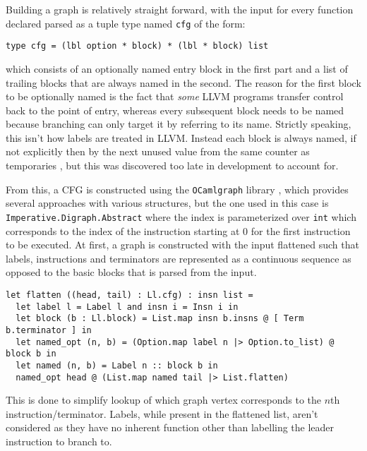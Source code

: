 \documentclass{article}
\begin{document}


Building a graph is relatively straight forward, with the input for every function declared parsed as a tuple type named \texttt{cfg}  of the form:
\begin{verbatim}
type cfg = (lbl option * block) * (lbl * block) list
\end{verbatim}
which consists of an optionally named entry block in the first part and a list of trailing blocks that are always named in the second. The reason for the first block to be optionally named is the fact that \textit{some} LLVM programs transfer control back to the point of entry, whereas every subsequent block needs to be named because branching can only target it by referring to its name. Strictly speaking, this isn't how labels are treated in LLVM. Instead each block is always named, if not explicitly then by the next unused value from the same counter as temporaries \cite{llvm-functions}, but this was discovered too late in development to account for.

From this, a CFG is constructed  using the \texttt{OCamlgraph} library \cite{ocamlgraph}, which provides several approaches with  various  structures, but the one used in this case is \texttt{Imperative.Digraph.Abstract} where the index is parameterized over \texttt{int} which corresponds to the index of the instruction starting at 0 for the first instruction to be executed. At first, a graph is constructed with the input flattened such that labels, instructions and terminators are represented as a continuous sequence as opposed to the basic blocks that is parsed from the input.

\begin{verbatim}
let flatten ((head, tail) : Ll.cfg) : insn list =
  let label l = Label l and insn i = Insn i in
  let block (b : Ll.block) = List.map insn b.insns @ [ Term b.terminator ] in
  let named_opt (n, b) = (Option.map label n |> Option.to_list) @ block b in
  let named (n, b) = Label n :: block b in
  named_opt head @ (List.map named tail |> List.flatten)
\end{verbatim}

\noindent This is done to simplify lookup of which graph vertex corresponds to the \(n\)th instruction/terminator. Labels, while present in the flattened list, aren't considered as they have no inherent function other than labelling the leader instruction to branch to.
\end{document}
